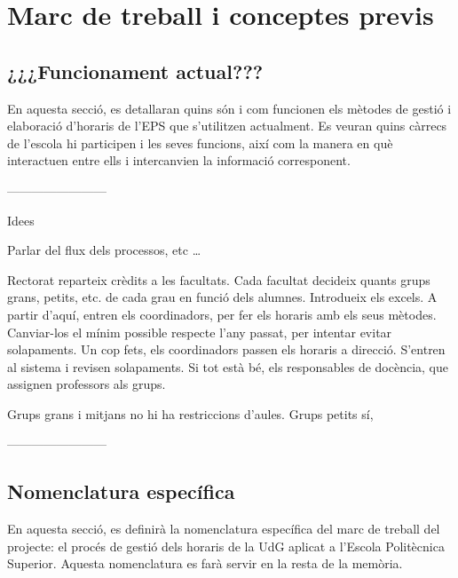 \documentclass[a4paper,12pt]{ThesisStyle}
\begin{document}
\chapter{Marc de treball i conceptes previs}
\label{cap:marcdetreball}

\section{¿¿¿Funcionament actual???}
\label{sec:funcionament_actual}

En aquesta secció, es detallaran quins són i com funcionen els mètodes de gestió i elaboració d'horaris de l'EPS que s'utilitzen actualment. Es veuran quins càrrecs de l'escola hi participen i les seves funcions, així com la manera en què interactuen entre ells i intercanvien la informació corresponent.

------------------------

Idees

Parlar del flux dels processos, etc \ldots

Rectorat reparteix crèdits a les facultats. Cada facultat decideix quants grups grans, petits, etc. de cada grau en funció dels alumnes. Introdueix els excels.
A partir d'aquí, entren els coordinadors, per fer els horaris amb els seus mètodes. Canviar-los el mínim possible respecte l'any passat, per intentar evitar
solapaments. Un cop fets, els coordinadors passen els horaris a direcció. S'entren al sistema i revisen solapaments. Si tot està bé, els responsables de docència,
que assignen professors als grups.

Grups grans i mitjans no hi ha restriccions d'aules. Grups petits sí,

------------------------

\section{Nomenclatura específica}
\label{sec:nomenclatura}

En aquesta secció, es definirà la nomenclatura específica del marc de treball del projecte: el procés de gestió dels horaris de la UdG aplicat a l'Escola Politècnica Superior. Aquesta nomenclatura es farà servir en la resta de la memòria.
\end{document}
